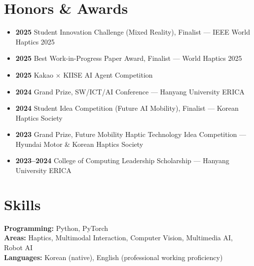 \documentclass[11pt,a4paper]{article}
\begin{document}
\section{Honors \& Awards}
\begin{itemize}
  \item \textbf{2025} \quad Student Innovation Challenge (Mixed Reality), Finalist --- IEEE World Haptics 2025
  \item \textbf{2025} \quad Best Work-in-Progress Paper Award, Finalist --- World Haptics 2025
  \item \textbf{2025} \quad Kakao $\times$ KIISE AI Agent Competition
  \item \textbf{2024} \quad Grand Prize, SW/ICT/AI Conference --- Hanyang University ERICA
  \item \textbf{2024} \quad Student Idea Competition (Future AI Mobility), Finalist --- Korean Haptics Society
  \item \textbf{2023} \quad Grand Prize, Future Mobility Haptic Technology Idea Competition --- Hyundai Motor \& Korean Haptics Society
  \item \textbf{2023--2024} \quad College of Computing Leadership Scholarship --- Hanyang University ERICA
\end{itemize}

\section{Skills}
\textbf{Programming:} Python, PyTorch \\
\textbf{Areas:} Haptics, Multimodal Interaction, Computer Vision, Multimedia AI, Robot AI \\
\textbf{Languages:} Korean (native), English (professional working proficiency)
\end{document}
